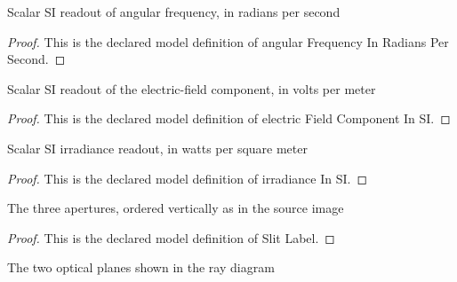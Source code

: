 \begin{definition}
  \label{def:physics:phyx-mini-0120:phyxminiproblems-problemphyxmini0120-angularfrequencyinradianspersecond}
  Scalar SI readout of angular frequency, in radians per second
\end{definition}
\begin{proof}
  This is the declared model definition of angular Frequency In Radians Per Second.
\end{proof}
\begin{definition}
  \label{def:physics:phyx-mini-0120:phyxminiproblems-problemphyxmini0120-electricfieldcomponentinsi}
  Scalar SI readout of the electric-field component, in volts per meter
\end{definition}
\begin{proof}
  This is the declared model definition of electric Field Component In SI.
\end{proof}
\begin{definition}[irradiance In SI]
  \label{def:physics:phyx-mini-0120:phyxminiproblems-problemphyxmini0120-irradianceinsi}
  Scalar SI irradiance readout, in watts per square meter
\end{definition}
\begin{proof}
  This is the declared model definition of irradiance In SI.
\end{proof}
\begin{definition}
  \label{def:physics:phyx-mini-0120:phyxminiproblems-problemphyxmini0120-slitlabel}
  The three apertures, ordered vertically as in the source image
\end{definition}
\begin{proof}
  This is the declared model definition of Slit Label.
\end{proof}
\begin{definition}
  \label{def:physics:phyx-mini-0120:phyxminiproblems-problemphyxmini0120-opticalplane}
  The two optical planes shown in the ray diagram
\end{definition}
